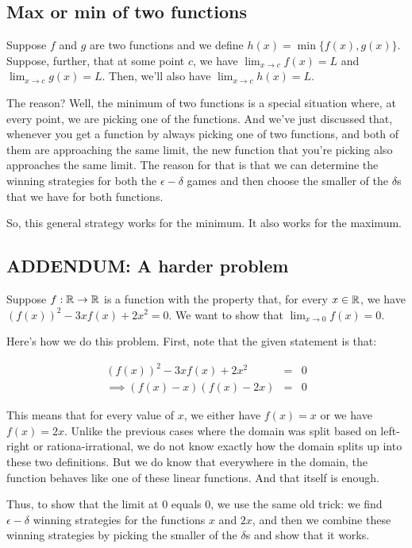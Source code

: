 \documentclass[10pt]{amsart}
\begin{document}
\subsection{Max or min of two functions}

Suppose $f$ and $g$ are two functions and we define $h(x) = \min \{
f(x), g(x) \}$. Suppose, further, that at some point $c$, we have
$\lim_{x \to c} f(x) = L$ and $\lim_{x \to c} g(x) = L$. Then, we'll
also have $\lim_{x \to c} h(x) = L$.

The reason? Well, the minimum of two functions is a special situation
where, at every point, we are picking one of the functions. And we've
just discussed that, whenever you get a function by always picking one
of two functions, and both of them are approaching the same limit, the
new function that you're picking also approaches the same limit. The
reason for that is that we can determine the winning strategies for
both the $\epsilon-\delta$ games and then choose the smaller of the
$\delta$s that we have for both functions.

So, this general strategy works for the minimum. It also works for the
maximum.
\subsection{ADDENDUM: A harder problem}

Suppose $f: \mathbb{R} \to \mathbb{R}$ is a function with the property that, for every
$x \in \mathbb{R}$, we have $(f(x))^2 - 3xf(x) + 2x^2 = 0$. We want to show
that $\lim_{x \to 0} f(x) = 0$.

Here's how we do this problem. First, note that the given statement is that:

\begin{eqnarray*}
  (f(x))^2 - 3xf(x) + 2x^2 & = & 0\\
  \implies (f(x) - x)(f(x) - 2x) & = & 0
\end{eqnarray*}

This means that for every value of $x$, we either have $f(x) = x$ or
we have $f(x) = 2x$. Unlike the previous cases where the domain
was split based on left-right or rationa-irrational, we do not know
exactly how the domain splits up into these two definitions. But we do
know that everywhere in the domain, the function behaves like one of
these linear functions. And that itself is enough.

Thus, to show that the limit at $0$ equals $0$, we use the same old
trick: we find $\epsilon-\delta$ winning strategies for the functions
$x$ and $2x$, and then we combine these winning strategies by picking
the smaller of the $\delta$s and show that it works.
\end{document}

